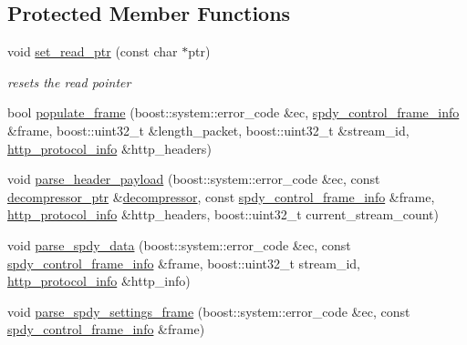 \subsection*{Protected Member Functions}
\begin{DoxyCompactItemize}
\item 
void \hyperlink{classpion_1_1spdy_1_1parser_a84d142819f982415844b77f5c3d8d0bb}{set\-\_\-read\-\_\-ptr} (const char $\ast$ptr)
\begin{DoxyCompactList}\small\item\em resets the read pointer \end{DoxyCompactList}\item 
bool \hyperlink{classpion_1_1spdy_1_1parser_aa0000b4cee0f8a2084f3e0056ab561de}{populate\-\_\-frame} (boost\-::system\-::error\-\_\-code \&ec, \hyperlink{structpion_1_1spdy_1_1spdy__control__frame__info}{spdy\-\_\-control\-\_\-frame\-\_\-info} \&frame, boost\-::uint32\-\_\-t \&length\-\_\-packet, boost\-::uint32\-\_\-t \&stream\-\_\-id, \hyperlink{namespacepion_1_1spdy_a5263e12cb89d30893e41f7b595cae89a}{http\-\_\-protocol\-\_\-info} \&http\-\_\-headers)
\item 
void \hyperlink{classpion_1_1spdy_1_1parser_a014d959f438085b36d8373ff45ae1572}{parse\-\_\-header\-\_\-payload} (boost\-::system\-::error\-\_\-code \&ec, const \hyperlink{namespacepion_1_1spdy_ac8512dffc9267ba133bd2c560f07fd1e}{decompressor\-\_\-ptr} \&\hyperlink{classpion_1_1spdy_1_1decompressor}{decompressor}, const \hyperlink{structpion_1_1spdy_1_1spdy__control__frame__info}{spdy\-\_\-control\-\_\-frame\-\_\-info} \&frame, \hyperlink{namespacepion_1_1spdy_a5263e12cb89d30893e41f7b595cae89a}{http\-\_\-protocol\-\_\-info} \&http\-\_\-headers, boost\-::uint32\-\_\-t current\-\_\-stream\-\_\-count)
\item 
void \hyperlink{classpion_1_1spdy_1_1parser_aae6750b7a90921dd6d8bc2da50cc1aa7}{parse\-\_\-spdy\-\_\-data} (boost\-::system\-::error\-\_\-code \&ec, const \hyperlink{structpion_1_1spdy_1_1spdy__control__frame__info}{spdy\-\_\-control\-\_\-frame\-\_\-info} \&frame, boost\-::uint32\-\_\-t stream\-\_\-id, \hyperlink{namespacepion_1_1spdy_a5263e12cb89d30893e41f7b595cae89a}{http\-\_\-protocol\-\_\-info} \&http\-\_\-info)
\item 
void \hyperlink{classpion_1_1spdy_1_1parser_a36bd7ae76e3796cf4f99a30aa728c800}{parse\-\_\-spdy\-\_\-settings\-\_\-frame} (boost\-::system\-::error\-\_\-code \&ec, const \hyperlink{structpion_1_1spdy_1_1spdy__control__frame__info}{spdy\-\_\-control\-\_\-frame\-\_\-info} \&frame)
\item 

\end{DoxyCompactItemize}
